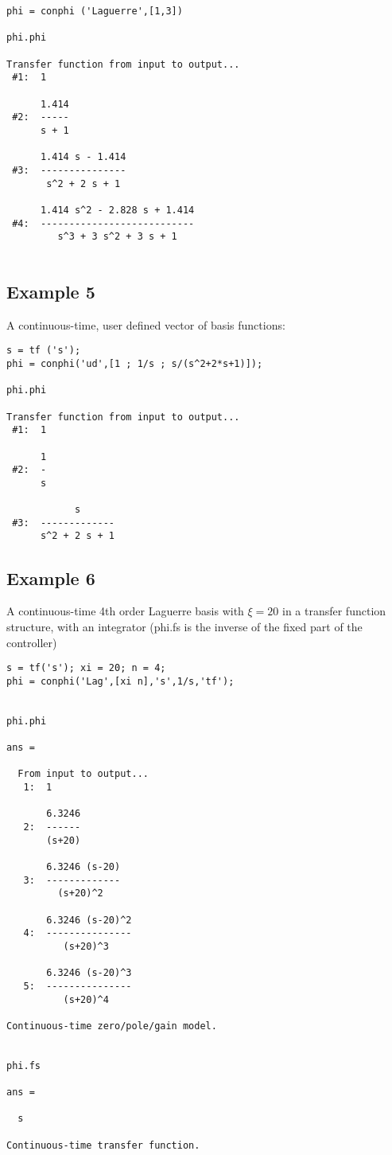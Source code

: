 \documentclass [12pt , a4paper] {report}
\begin{document}
\begin{lstlisting}
phi = conphi ('Laguerre',[1,3])

phi.phi
 
Transfer function from input to output...
 #1:  1
 
      1.414
 #2:  -----
      s + 1
 
      1.414 s - 1.414
 #3:  ---------------
       s^2 + 2 s + 1
 
      1.414 s^2 - 2.828 s + 1.414
 #4:  ---------------------------
         s^3 + 3 s^2 + 3 s + 1
         
\end{lstlisting}

\subsection{Example 5} A continuous-time, user defined vector of basis functions:

\begin{lstlisting}
s = tf ('s');
phi = conphi('ud',[1 ; 1/s ; s/(s^2+2*s+1)]);

phi.phi
 
Transfer function from input to output...
 #1:  1
 
      1
 #2:  -
      s
 
            s
 #3:  -------------
      s^2 + 2 s + 1
  \end{lstlisting}

  \subsection{Example 6} A continuous-time 4th order Laguerre basis with $\xi=20$ in a transfer function structure, with an integrator (phi.fs is the inverse of the fixed part of the controller)

  \begin{lstlisting}
s = tf('s'); xi = 20; n = 4;
phi = conphi('Lag',[xi n],'s',1/s,'tf');


phi.phi

ans =
 
  From input to output...
   1:  1
 
       6.3246
   2:  ------
       (s+20)
 
       6.3246 (s-20)
   3:  -------------
         (s+20)^2
 
       6.3246 (s-20)^2
   4:  ---------------
          (s+20)^3
 
       6.3246 (s-20)^3
   5:  ---------------
          (s+20)^4
 
Continuous-time zero/pole/gain model.


phi.fs

ans =
 
  s
 
Continuous-time transfer function.
\end{lstlisting}
\end{document}
